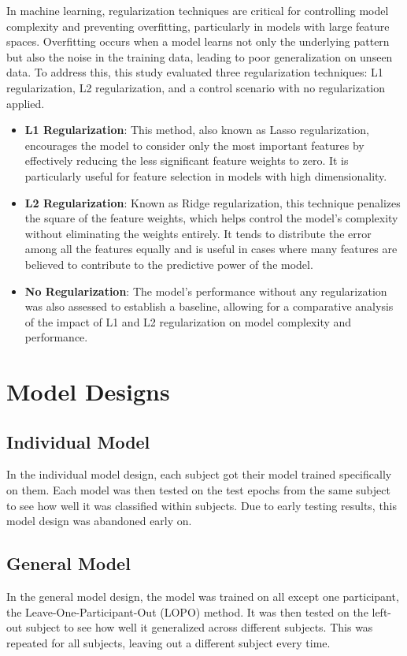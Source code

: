 In machine learning, regularization techniques are critical for controlling model complexity and preventing overfitting, particularly in models with large feature spaces. Overfitting occurs when a model learns not only the underlying pattern but also the noise in the training data, leading to poor generalization on unseen data. To address this, this study evaluated three regularization techniques: L1 regularization, L2 regularization, and a control scenario with no regularization applied.

\begin{itemize}
    \item \textbf{L1 Regularization}: This method, also known as Lasso regularization, encourages the model to consider only the most important features by effectively reducing the less significant feature weights to zero. It is particularly useful for feature selection in models with high dimensionality.
    \item \textbf{L2 Regularization}: Known as Ridge regularization, this technique penalizes the square of the feature weights, which helps control the model's complexity without eliminating the weights entirely. It tends to distribute the error among all the features equally and is useful in cases where many features are believed to contribute to the predictive power of the model.
    \item \textbf{No Regularization}: The model's performance without any regularization was also assessed to establish a baseline, allowing for a comparative analysis of the impact of L1 and L2 regularization on model complexity and performance.
\end{itemize}

\section{Model Designs}
\subsection{Individual Model}
In the individual model design, each subject got their model trained specifically on them. Each model was then tested on the test epochs from the same subject to see how well it was classified within subjects. Due to early testing results, this model design was abandoned early on.
\subsection{General Model}
In the general model design, the model was trained on all except one participant, the Leave-One-Participant-Out (LOPO) method. It was then tested on the left-out subject to see how well it generalized across different subjects. This was repeated for all subjects, leaving out a different subject every time.
